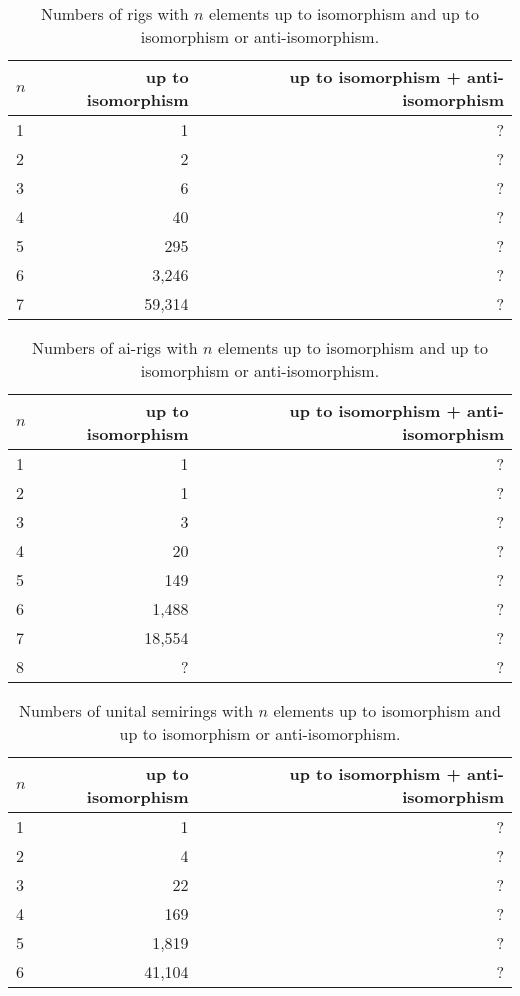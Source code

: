 \documentclass{article}
\theoremstyle{definition}
\begin{document}
\begin{table}[ht]
    \centering
    \begin{tabular}{l|r|r}
      \toprule
      $n$ & up to isomorphism & up to isomorphism + anti-isomorphism \\
      \midrule
      1 & 1         & ? \\
      2 & 2         & ? \\
      3 & 6         & ? \\
      4 & 40        & ? \\
      5 & 295       & ? \\
      6 & 3,246     & ? \\
      7 & 59,314    & ? \\
    \end{tabular}
    \caption{Numbers of rigs with $n$ elements up to isomorphism and up
    to isomorphism or anti-isomorphism.}
    \label{tab:rigs}
\end{table}

\begin{table}[ht]
    \centering
    \begin{tabular}{l|r|r}
      \toprule
      $n$ & up to isomorphism & up to isomorphism + anti-isomorphism \\
      \midrule
      1 & 1         & ? \\
      2 & 1         & ? \\
      3 & 3         & ? \\
      4 & 20        & ? \\
      5 & 149       & ? \\
      6 & 1,488     & ? \\
      7 & 18,554    & ? \\
      8 & ?         & ? \\
    \end{tabular}
    \caption{Numbers of ai-rigs with $n$ elements up to isomorphism and up
    to isomorphism or anti-isomorphism.}
    \label{tab:ai-rigs}
\end{table}

\begin{table}[ht]
    \centering
    \begin{tabular}{l|r|r}
      \toprule
      $n$ & up to isomorphism & up to isomorphism + anti-isomorphism \\
      \midrule
      1 & 1         & ? \\
      2 & 4         & ? \\
      3 & 22        & ? \\
      4 & 169       & ? \\
      5 & 1,819     & ? \\
      6 & 41,104    & ? \\
    \end{tabular}
    \caption{Numbers of unital semirings with $n$ elements up to isomorphism and up
    to isomorphism or anti-isomorphism.}
    \label{tab:unital-semirings}
\end{table}
\end{document}
